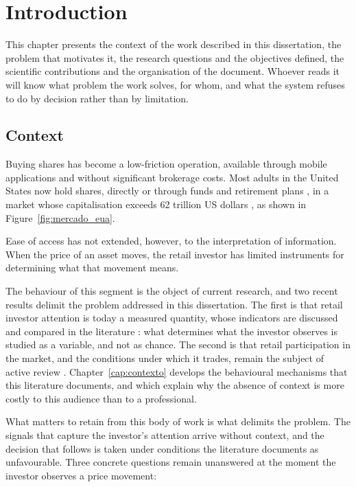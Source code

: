 \chapter{Introduction}
\label{cap:introducao}

This chapter presents the context of the work described in this dissertation, the problem that
motivates it, the research questions and the objectives defined, the scientific contributions and
the organisation of the document. Whoever reads it will know what problem the work solves, for whom, and what the system refuses to do by decision rather than by limitation.

\section{Context}
\label{sec:intro_origem}

Buying shares has become a low-friction operation, available through mobile applications and
without significant brokerage costs. Most adults in the United States now hold shares, directly or
through funds and retirement plans \autocite{gallup2025stock}, in a market whose capitalisation
exceeds 62 trillion US dollars \autocite{sifma2025factbook}, as shown in
Figure~\ref{fig:mercado_eua}.

Ease of access has not extended, however, to the interpretation of information. When the price of
an asset moves, the retail investor has limited instruments for determining what that movement
means.

The behaviour of this segment is the object of current research, and two recent results delimit the
problem addressed in this dissertation. The first is that retail investor attention is today a
measured quantity, whose indicators are discussed and compared in the literature
\autocite{cahill2025attention}: what determines what the investor observes is studied as a
variable, and not as chance. The second is that retail participation in the market, and the
conditions under which it trades, remain the subject of active review
\autocite{ernst2026retail}. Chapter~\ref{cap:contexto} develops the behavioural mechanisms that
this literature documents, and which explain why the absence of context is more costly to this
audience than to a professional.

What matters to retain from this body of work is what delimits the problem. The signals that
capture the investor's attention arrive without context, and the decision that follows is taken
under conditions the literature documents as unfavourable. Three concrete questions remain
unanswered at the moment the investor observes a price movement:

